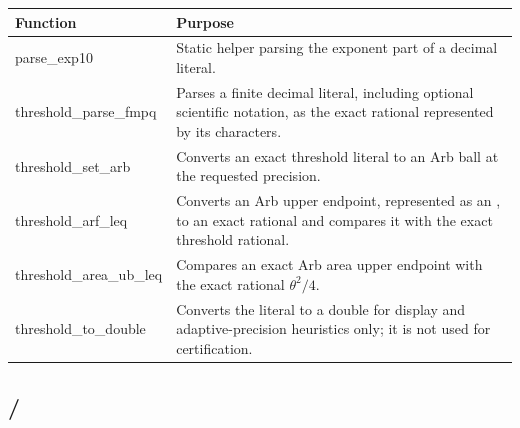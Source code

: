 \documentclass[11pt]{article}
\DeclareRobustCommand{\code}[1]{\texttt{\detokenize{#1}}}
\begin{document}
\begin{longtable}{>{\ttfamily}p{}p{}}
\toprule
Function & Purpose \\
\midrule
\endhead
parse\_exp10 & Static helper parsing the exponent part of a decimal literal. \\
threshold\_parse\_fmpq & Parses a finite decimal literal, including optional scientific notation, as the exact rational represented by its characters. \\
threshold\_set\_arb & Converts an exact threshold literal to an Arb ball at the requested precision. \\
threshold\_arf\_leq & Converts an Arb upper endpoint, represented as an \code{arf\_t}, to an exact rational and compares it with the exact threshold rational. \\
threshold\_area\_ub\_leq & Compares an exact Arb area upper endpoint with the exact rational \(\theta^2/4\). \\
threshold\_to\_double & Converts the literal to a double for display and adaptive-precision heuristics only; it is not used for certification. \\
\bottomrule
\end{longtable}

\subsection{\code{cert.c}/\code{cert.h}}
\end{document}
